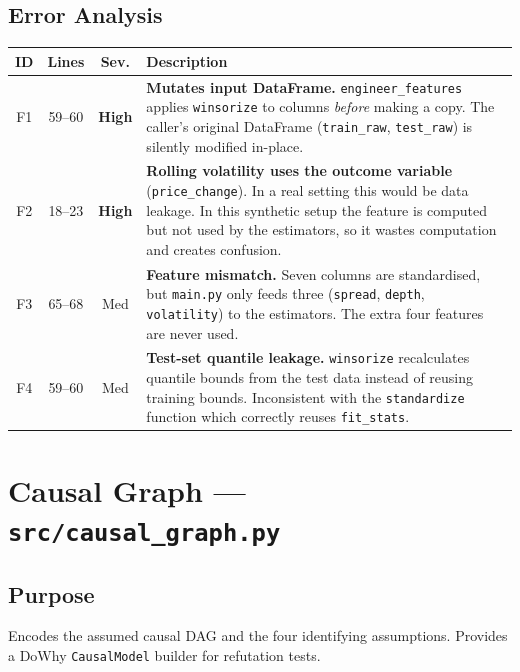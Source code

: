 \documentclass[11pt, letterpaper]{article}
\begin{document}
\subsection{Error Analysis}

\begin{center}
\begin{tabularx}{\textwidth}{c c c X}
    \toprule
    \textbf{ID} & \textbf{Lines} & \textbf{Sev.} & \textbf{Description} \\
    \midrule
    F1 & 59--60 & \textcolor{highsev}{\textbf{High}} &
        \textbf{Mutates input DataFrame.} \texttt{engineer\_features} applies \texttt{winsorize} to columns \emph{before} making a copy. The caller's original DataFrame (\texttt{train\_raw}, \texttt{test\_raw}) is silently modified in-place. \\[6pt]
    F2 & 18--23 & \textcolor{highsev}{\textbf{High}} &
        \textbf{Rolling volatility uses the outcome variable} (\texttt{price\_change}). In a real setting this would be data leakage. In this synthetic setup the feature is computed but not used by the estimators, so it wastes computation and creates confusion. \\[6pt]
    F3 & 65--68 & \textcolor{medsev}{Med} &
        \textbf{Feature mismatch.} Seven columns are standardised, but \texttt{main.py} only feeds three (\texttt{spread}, \texttt{depth}, \texttt{volatility}) to the estimators. The extra four features are never used. \\[6pt]
    F4 & 59--60 & \textcolor{medsev}{Med} &
        \textbf{Test-set quantile leakage.} \texttt{winsorize} recalculates quantile bounds from the test data instead of reusing training bounds. Inconsistent with the \texttt{standardize} function which correctly reuses \texttt{fit\_stats}. \\
    \bottomrule
\end{tabularx}
\end{center}


\newpage
\section{Causal Graph --- \texttt{src/causal\_graph.py}}
\label{sec:causalgraph}

\subsection{Purpose}
Encodes the assumed causal DAG and the four identifying assumptions. Provides a DoWhy \texttt{CausalModel} builder for refutation tests.
\end{document}
